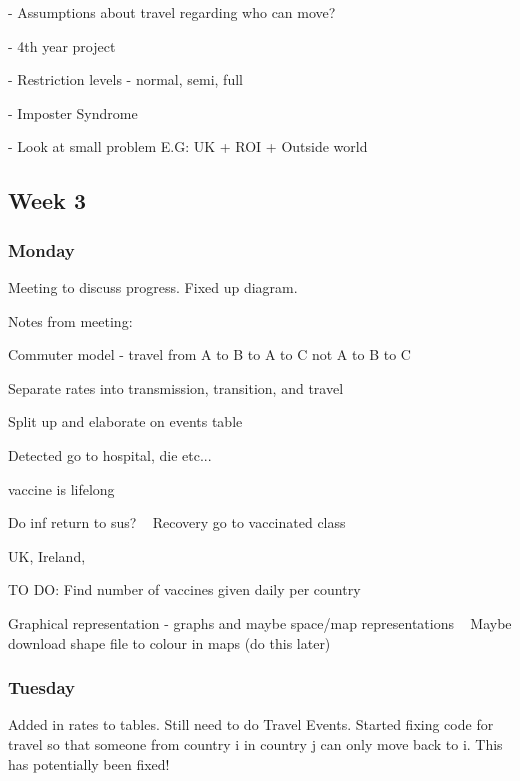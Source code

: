\documentclass[a4paper,11pt]{article}
\theoremstyle{plain}
\theoremstyle{definition}
\begin{document}
- Assumptions about travel regarding who can move?

- 4th year project

- Restriction levels - normal, semi, full

- Imposter Syndrome

- Look at small problem E.G: UK + ROI + Outside world

\subsection{Week 3}

\subsubsection{Monday}

Meeting to discuss progress. Fixed up diagram.

Notes from meeting:

Commuter model - travel from A to B to A to C not A to B to C

Separate rates into transmission, transition, and travel

Split up and elaborate on events table

Detected go to hospital, die etc...

vaccine is lifelong

Do inf return to sus? ~ Recovery go to vaccinated class

UK, Ireland, 



TO DO:
Find number of vaccines given daily per country

Graphical representation - graphs and maybe space/map representations ~ Maybe download shape file to colour in maps (do this later)









\subsubsection{Tuesday}

Added in rates to tables. Still need to do Travel Events. Started fixing code for travel so that someone from country i in country j can only move back to i. This has potentially been fixed!
\end{document}
